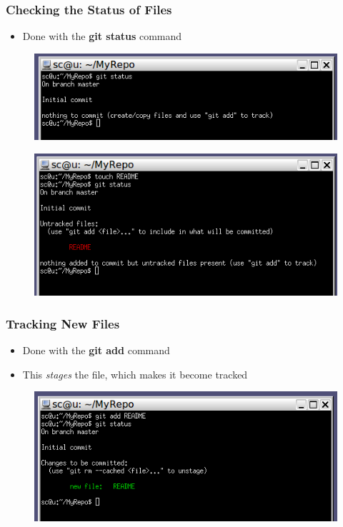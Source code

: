 \documentclass{beamer}
\begin{document}
\begin{frame}
	\frametitle{Checking the Status of Files}
	\begin{itemize}
		\item{Done with the \textbf{git status} command}
	\end{itemize}
	\begin{figure}
		\includegraphics[scale=0.50]{Checking_the_Status_of_Files-0.png}
	\end{figure}
	\begin{figure}
		\includegraphics[scale=0.50]{Checking_the_Status_of_Files-1.png}
	\end{figure}
\end{frame}

\begin{frame}
	\frametitle{Tracking New Files}
	\begin{itemize}
		\item{Done with the \textbf{git add} command}
		\item{This \textit{stages} the file, which makes it become tracked}
	\end{itemize}
	\begin{figure}
		\includegraphics[scale=0.54]{Tracking_New_Files-0.png}
	\end{figure}
\end{frame}
\end{document}
